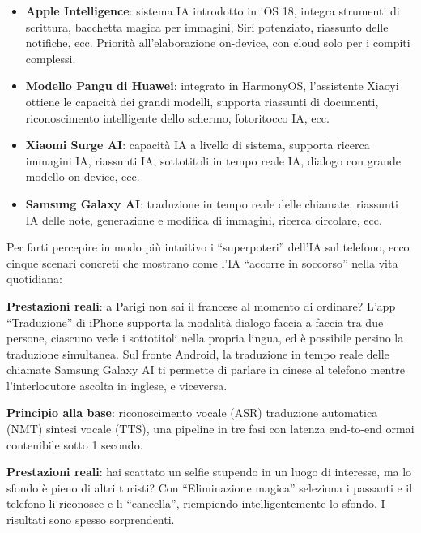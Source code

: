 
\begin{itemize}
  \item \textbf{Apple Intelligence}: sistema IA introdotto in iOS 18, integra strumenti di scrittura, bacchetta magica per immagini, Siri potenziato, riassunto delle notifiche, ecc. Priorità all'elaborazione on-device, con cloud solo per i compiti complessi.
  \item \textbf{Modello Pangu di Huawei}: integrato in HarmonyOS, l'assistente Xiaoyi ottiene le capacità dei grandi modelli, supporta riassunti di documenti, riconoscimento intelligente dello schermo, fotoritocco IA, ecc.
  \item \textbf{Xiaomi Surge AI}: capacità IA a livello di sistema, supporta ricerca immagini IA, riassunti IA, sottotitoli in tempo reale IA, dialogo con grande modello on-device, ecc.
  \item \textbf{Samsung Galaxy AI}: traduzione in tempo reale delle chiamate, riassunti IA delle note, generazione e modifica di immagini, ricerca circolare, ecc.
\end{itemize}


Per farti percepire in modo più intuitivo i “superpoteri” dell'IA sul telefono, ecco cinque scenari concreti che mostrano come l'IA “accorre in soccorso” nella vita quotidiana:


\textbf{Prestazioni reali}: a Parigi non sai il francese al momento di ordinare? L'app “Traduzione” di iPhone supporta la modalità dialogo faccia a faccia tra due persone, ciascuno vede i sottotitoli nella propria lingua, ed è possibile persino la traduzione simultanea. Sul fronte Android, la traduzione in tempo reale delle chiamate Samsung Galaxy AI ti permette di parlare in cinese al telefono mentre l'interlocutore ascolta in inglese, e viceversa.

\textbf{Principio alla base}: riconoscimento vocale (ASR) traduzione automatica (NMT) sintesi vocale (TTS), una pipeline in tre fasi con latenza end-to-end ormai contenibile sotto 1 secondo.


\textbf{Prestazioni reali}: hai scattato un selfie stupendo in un luogo di interesse, ma lo sfondo è pieno di altri turisti? Con “Eliminazione magica” seleziona i passanti e il telefono li riconosce e li “cancella”, riempiendo intelligentemente lo sfondo. I risultati sono spesso sorprendenti.

